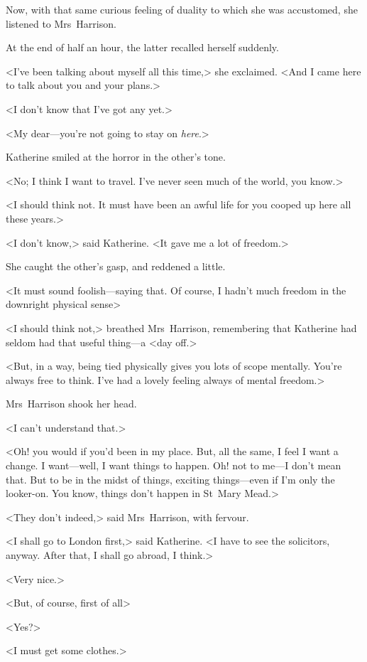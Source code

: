 Now, with that same curious feeling of duality to which she was accustomed, she listened to Mrs~Harrison.

At the end of half an hour, the latter recalled herself suddenly.

<I've been talking about myself all this time,> she exclaimed. <And I came here to talk about you and your plans.>

<I don't know that I've got any yet.>

<My dear—you're not going to stay on \emph{here}.>

Katherine smiled at the horror in the other's tone.

<No; I think I want to travel. I've never seen much of the world, you know.>

<I should think not. It must have been an awful life for you cooped up here all these years.>

<I don't know,> said Katherine. <It gave me a lot of freedom.>

She caught the other's gasp, and reddened a little.

<It must sound foolish—saying that. Of course, I hadn't much freedom in the downright physical sense\longdash>

<I should think not,> breathed Mrs~Harrison, remembering that Katherine had seldom had that useful thing—a <day off.>

<But, in a way, being tied physically gives you lots of scope mentally. You're always free to think. I've had a lovely feeling always of mental freedom.>

Mrs~Harrison shook her head.

<I can't understand that.>

<Oh! you would if you'd been in my place. But, all the same, I feel I want a change. I want—well, I want things to happen. Oh! not to me—I don't mean that. But to be in the midst of things, exciting things—even if I'm only the looker-on. You know, things don't happen in St~Mary Mead.>

<They don't indeed,> said Mrs~Harrison, with fervour.

<I shall go to London first,> said Katherine. <I have to see the solicitors, anyway. After that, I shall go abroad, I think.>

<Very nice.>

<But, of course, first of all\longdash>

<Yes?>

<I must get some clothes.>

